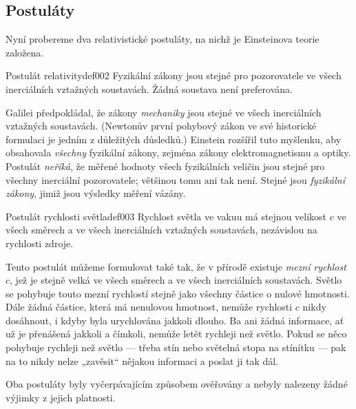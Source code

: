       \subsection{Postuláty}
        Nyní probereme dva relativistické postuláty, na nichž je Einsteinova teorie založena.

        \begin{fyzdef}{Postulát relativity}{def002}
          Fyzikální zákony jsou stejné pro pozorovatele ve všech inerciálních vztažných soustavách.
          Žádná soustava není preferována.
        \end{fyzdef}

        Galilei předpokládal, že zákony \emph{mechaniky} jsou stejné ve všech inerciálních vztažných
        soustavách. (Newtonův první pohybový zákon ve své historické formulaci je jedním z
        důležitých důsledků.) Einstein rozšířil tuto myšlenku, aby obsahovala \emph{všechny}
        fyzikální zákony, zejména zákony elektromagnetismu a optiky. Postulát \emph{neříká}, že
        měřené hodnoty všech fyzikálních veličin jsou stejné pro všechny inerciální pozorovatele;
        většinou tomu ani tak není. Stejné jsou \emph{fyzikální zákony}, jimiž jsou výsledky měření
        vázány.

        \begin{fyzdef}{Postulát rychlosti světla}{def003}        
          Rychlost světla ve vakuu má stejnou velikost \(c\) ve všech směrech a ve všech
          inerciálních vztažných soustavách, nezávislou na rychlosti zdroje.
        \end{fyzdef}

        Tento postulát můžeme formulovat také tak, že v přírodě existuje \emph{mezní rychlost}
        \(c\), jež je stejně velká ve všech směrech a ve všech inerciálních soustavách. Světlo se
        pohybuje touto mezní rychlostí stejně jako všechny částice o nulové hmotnosti. Dále žádná
        částice, která má nenulovou hmotnost, nemůže rychlosti \(c\) nikdy dosáhnout, i kdyby byla
        urychlována jakkoli dlouho. Ba ani žádná informace, ať už je přenášená jakkoli a čímkoli,
        nemůže letět rychleji než světlo. Pokud se něco pohybuje rychleji než světlo — třeba stín
        nebo světelná stopa na stínítku — pak na to nikdy nelze „zavěsit“ nějakou informaci a poslat
        ji tak dál.

        Oba postuláty byly vyčerpávajícím způsobem ověřovány a nebyly nalezeny žádné výjimky z
        jejich platnosti.
      
